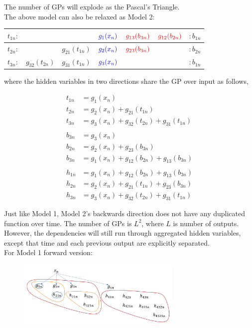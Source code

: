 \documentclass{article}
\begin{document}
The number of GPs will explode as the Pascal's Triangle.\\

The above model can also be relaxed as Model 2:
\begin{table}[H]
\centering
\begin{tabular}{|c|c|c|c|c|c|c|}
	\hline
	$t_{1n}:$ & & & $\color{blue} g_1(x_n)$ & $\color{red} g_{13}(b_{3n})$ & $\color{red} g_{12}(b_{2n})$  & $:b_{1n}$\\
	\hline
	$t_{2n}:$ & & $g_{21}(t_{1n})$ & $\color{blue} g_2(x_n)$ & $\color{red} g_{23}(b_{3n})$ &  & $:b_{2n}$\\
	\hline
	$t_{3n}:$ &$g_{32}(t_{2n})$ & $g_{31}(t_{1n})$ & $\color{blue} g_3(x_n)$ &  &  & $:b_{1n}$\\
	\hline
\end{tabular}
\end{table}

where the hidden variables in two directions share the GP over input as follows,

\begin{align*}
	t_{1n} &= g_1(x_n)\\
	t_{2n} &= g_2(x_n) + g_{21}(t_{1n})\\
	t_{3n} &= g_3(x_n) + g_{32}(t_{2n}) + g_{31}(t_{1n})\\
	\\
	b_{3n} &= g_3(x_n)\\
	b_{2n} &= g_2(x_n) + g_{23}(b_{3n})\\
	b_{3n} &= g_1(x_n) + g_{12}(b_{2n}) + g_{13}(b_{3n})\\
	\\
	h_{1n} &= g_1(x_n) + g_{12}(b_{2n}) + g_{13}(b_{3n})\\
	h_{2n} &= g_2(x_n) + g_{21}(t_{1n}) + g_{23}(b_{3n})\\
	h_{3n} &= g_3(x_n) + g_{32}(t_{2n}) + g_{31}(t_{1n})
\end{align*}

Just like Model 1, Model 2's backwards direction does not have any duplicated function over time. The number of GPs is $L^2$, where $L$ is number of outputs. However, the dependencies will still run through aggregated hidden variables, except that time and each previous output are explicitly separated.\\

For Model 1 forward version:

\begin{figure}[H]
\centering
\includegraphics[width=0.7\textwidth]{new2.png}
\end{figure}
\end{document}
